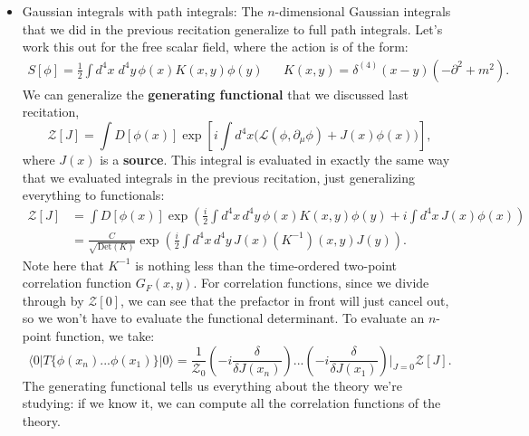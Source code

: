 \documentclass[12pt, oneside]{article}   	%
\theoremstyle{definition}
\begin{document}
\begin{itemize}
	\item Gaussian integrals with path integrals: The $n$-dimensional Gaussian integrals that we did in the previous recitation generalize to full path integrals. Let's work this out for the free scalar field, where the action is of the form:
	\begin{align}
		S[\phi] = \frac{1}{2} \int d^4 x\; d^4 y \, \phi(x) K(x, y) \phi(y) && K(x, y) = \delta^{(4)}(x - y) (-\partial^2 + m^2).
	\end{align}
	We can generalize the \textbf{generating functional} that we discussed last recitation,
	\begin{equation}
		\mathcal Z[J] = \int D[\phi(x)] \exp\left[ i\int d^4 x \bigg( \mathcal L(\phi, \partial_\mu\phi) + J(x) \phi(x) \bigg) \right],
	\end{equation}
	where $J(x)$ is a \textbf{source}. This integral is evaluated in exactly the same way that we evaluated integrals in the previous recitation, just generalizing everything to functionals:
	\begin{align}
		\mathcal Z[J] &= \int D[\phi(x)] \exp \left( \frac{i}{2}\int d^4 x\, d^4y \, \phi(x) K(x, y) \phi(y) + i\int d^4 x\, J(x) \phi(x) \right) \\
		&= \frac{C}{\sqrt{\mathrm{Det}(K)}} \exp \left( \frac{i}{2} \int d^4 x\, d^4 y\, J(x) (K^{-1}) (x, y) J(y) \right).
	\end{align}
	Note here that $K^{-1}$ is nothing less than the time-ordered two-point correlation function $G_F(x, y)$. For correlation functions, since we divide through by $\mathcal Z[0]$, we can see that the prefactor in front will just cancel out, so we won't have to evaluate the functional determinant. To evaluate an $n$-point function, we take:
	\begin{equation}
		\langle 0 | T\{\phi(x_n) ... \phi(x_1) \} |0\rangle = \frac{1}{\mathcal Z_0} \left(-i\frac{\delta}{\delta J(x_n)} \right) ... \left(-i\frac{\delta}{\delta J(x_1)} \right)\bigg|_{J = 0} \mathcal Z[J].
	\end{equation}
	The generating functional tells us everything about the theory we're studying: if we know it, we can compute all the correlation functions of the theory. 
	

\end{itemize}
\end{document}
